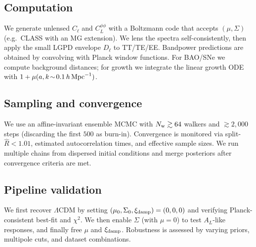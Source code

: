 \subsection{Computation}
We generate unlensed $C_\ell$ and $C_L^{\phi\phi}$ with a Boltzmann code that accepts $(\mu,\Sigma)$ (e.g.\ CLASS with an MG extension). We lens the spectra self-consistently, then apply the small LGPD envelope $D_\ell$ to TT/TE/EE. Bandpower predictions are obtained by convolving with Planck window functions. For BAO/SNe we compute background distances; for growth we integrate the linear growth ODE with $1+\mu(a,k\!\sim\!0.1\,h\,{\rm Mpc}^{-1})$.

\subsection{Sampling and convergence}
We use an affine-invariant ensemble MCMC with $N_{\rm w}\gtrsim 64$ walkers and $\gtrsim 2{,}000$ steps (discarding the first $500$ as burn-in). Convergence is monitored via split-$\hat{R}<1.01$, estimated autocorrelation times, and effective sample sizes. We run multiple chains from dispersed initial conditions and merge posteriors after convergence criteria are met.

\subsection{Pipeline validation}
We first recover $\Lambda$CDM by setting $(\mu_0,\Sigma_0,\xi_{\rm damp})=(0,0,0)$ and verifying Planck-consistent best-fit and $\chi^2$. We then enable $\Sigma$ (with $\mu=0$) to test $A_L$-like responses, and finally free $\mu$ and $\xi_{\rm damp}$. Robustness is assessed by varying priors, multipole cuts, and dataset combinations.
